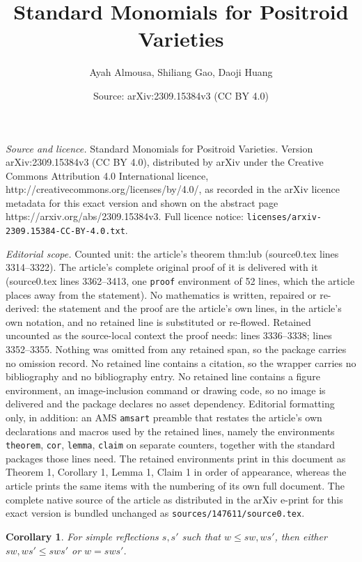 \documentclass[10pt,a4paper]{amsart}
\title{Standard Monomials for Positroid Varieties}
\author{Ayah Almousa, Shiliang Gao, Daoji Huang}
\date{Source: arXiv:2309.15384v3 (CC BY 4.0)}
\newtheorem{cor}{Corollary}
\begin{document}
\maketitle

\noindent\emph{Source and licence.} Standard Monomials for Positroid Varieties. Version arXiv:2309.15384v3 (CC BY 4.0), distributed by arXiv under the Creative Commons Attribution 4.0 International licence, http://creativecommons.org/licenses/by/4.0/, as recorded in the arXiv licence metadata for this exact version and shown on the abstract page https://arxiv.org/abs/2309.15384v3. Full licence notice: \texttt{licenses/arxiv-2309.15384-CC-BY-4.0.txt}.\par\smallskip

\noindent\textit{Editorial scope.} Counted unit: the article's theorem thm:lub (source0.tex lines 3314--3322). The article's complete original proof of it is delivered with it (source0.tex lines 3362--3413, one \texttt{proof} environment of 52 lines, which the article places away from the statement). No mathematics is written, repaired or re-derived: the statement and the proof are the article's own lines, in the article's own notation, and no retained line is substituted or re-flowed.  Retained uncounted as the source-local context the proof needs: lines 3336--3338; lines 3352--3355.  Nothing was omitted from any retained span, so the package carries no omission record.  No retained line contains a citation, so the wrapper carries no bibliography and no bibliography entry.  No retained line contains a figure environment, an image-inclusion command or drawing code, so no image is delivered and the package declares no asset dependency.  Editorial formatting only, in addition: an AMS \texttt{amsart} preamble that restates the article's own declarations and macros used by the retained lines, namely the environments \texttt{theorem}, \texttt{cor}, \texttt{lemma}, \texttt{claim} on separate counters, together with the standard packages those lines need.  The retained environments print in this document as Theorem 1, Corollary 1, Lemma 1, Claim 1 in order of appearance, whereas the article prints the same items with the numbering of its own full document.  The complete native source of the article as distributed in the arXiv e-print for this exact version is bundled unchanged as \texttt{sources/147611/source0.tex}.
\begin{cor}\label{cor:lift}
    For simple reflections $s,s'$ such that $w\leq sw,ws'$, then either $sw,ws'\leq sws'$ or $w = sws'$. 
\end{cor}
\end{document}
